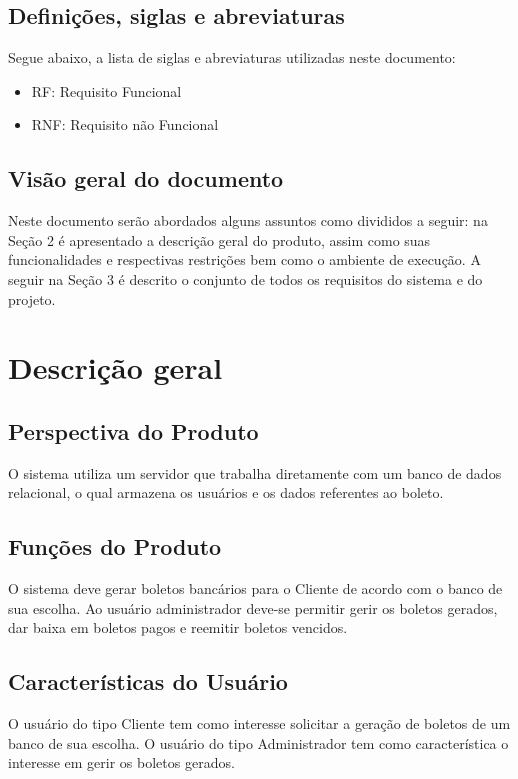 \documentclass[12pt,a4paper,onecolumn,titlepage]{article}
\begin{document}
\subsection{Definições, siglas e abreviaturas}

Segue abaixo, a lista de siglas e abreviaturas utilizadas neste documento:
\begin{itemize}
\item RF: Requisito Funcional
\item RNF: Requisito não Funcional
\end{itemize}

\subsection{Visão geral do documento}

Neste documento serão abordados alguns assuntos como divididos a seguir:
na Seção 2 é apresentado a descrição geral do produto, assim como suas
funcionalidades e respectivas restrições bem como o ambiente de execução.
A seguir na Seção 3 é descrito o conjunto de todos os requisitos do sistema
e do projeto.

\section{Descrição geral}
\label{sect:descricao}

\subsection{Perspectiva do Produto}

O sistema utiliza um servidor que trabalha diretamente com um banco de dados relacional, o qual armazena os usuários e os dados referentes ao boleto.


\subsection{Funções do Produto}
O sistema deve gerar boletos bancários para o Cliente de acordo com o banco de sua escolha. Ao usuário administrador deve-se permitir gerir os boletos gerados, dar baixa em boletos pagos e reemitir boletos vencidos.
\subsection{Características do Usuário}
O usuário do tipo Cliente tem como interesse
solicitar a geração de boletos de um banco de sua escolha. O usuário do tipo
Administrador tem como característica o interesse em gerir os boletos gerados.
\end{document}
